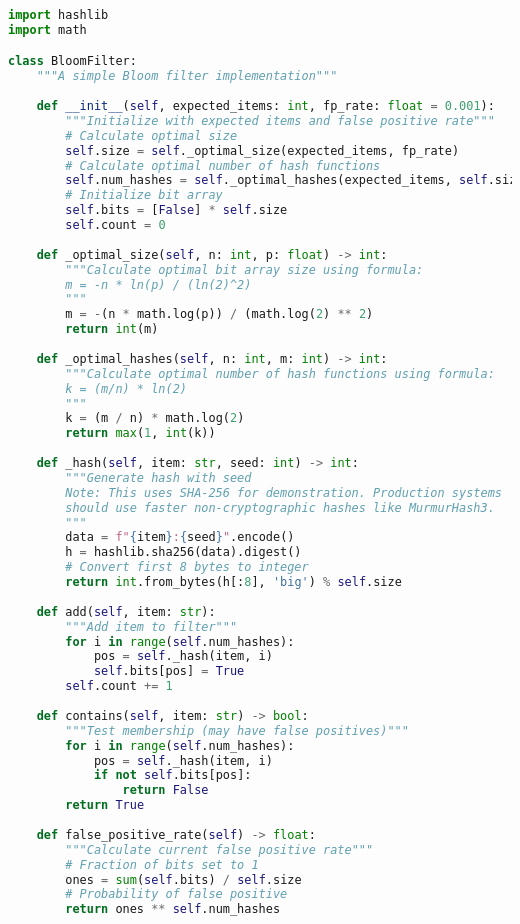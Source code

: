 \begin{lstlisting}[language=Python, caption={Basic Bloom filter implementation}]
import hashlib
import math

class BloomFilter:
    """A simple Bloom filter implementation"""
    
    def __init__(self, expected_items: int, fp_rate: float = 0.001):
        """Initialize with expected items and false positive rate"""
        # Calculate optimal size
        self.size = self._optimal_size(expected_items, fp_rate)
        # Calculate optimal number of hash functions
        self.num_hashes = self._optimal_hashes(expected_items, self.size)
        # Initialize bit array
        self.bits = [False] * self.size
        self.count = 0
        
    def _optimal_size(self, n: int, p: float) -> int:
        """Calculate optimal bit array size using formula:
        m = -n * ln(p) / (ln(2)^2)
        """
        m = -(n * math.log(p)) / (math.log(2) ** 2)
        return int(m)
    
    def _optimal_hashes(self, n: int, m: int) -> int:
        """Calculate optimal number of hash functions using formula:
        k = (m/n) * ln(2)
        """
        k = (m / n) * math.log(2)
        return max(1, int(k))
    
    def _hash(self, item: str, seed: int) -> int:
        """Generate hash with seed
        Note: This uses SHA-256 for demonstration. Production systems
        should use faster non-cryptographic hashes like MurmurHash3.
        """
        data = f"{item}:{seed}".encode()
        h = hashlib.sha256(data).digest()
        # Convert first 8 bytes to integer
        return int.from_bytes(h[:8], 'big') % self.size
    
    def add(self, item: str):
        """Add item to filter"""
        for i in range(self.num_hashes):
            pos = self._hash(item, i)
            self.bits[pos] = True
        self.count += 1
    
    def contains(self, item: str) -> bool:
        """Test membership (may have false positives)"""
        for i in range(self.num_hashes):
            pos = self._hash(item, i)
            if not self.bits[pos]:
                return False
        return True
    
    def false_positive_rate(self) -> float:
        """Calculate current false positive rate"""
        # Fraction of bits set to 1
        ones = sum(self.bits) / self.size
        # Probability of false positive
        return ones ** self.num_hashes
\end{lstlisting}

